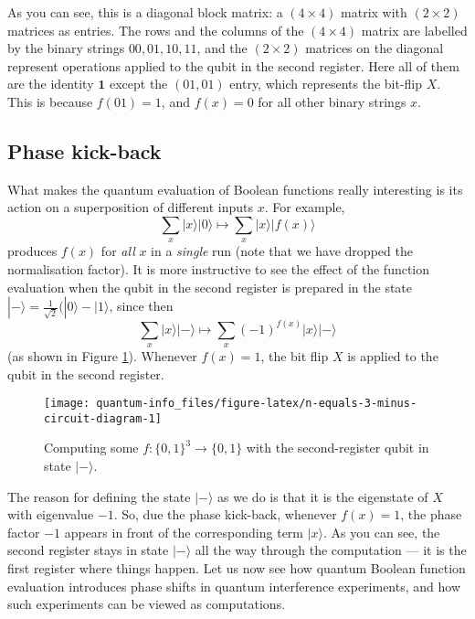 \documentclass[fleqn]{article}
\begin{document}
As you can see, this is a diagonal block matrix: a \((4\times 4)\) matrix with \((2\times 2)\) matrices as entries.
The rows and the columns of the \((4\times 4)\) matrix are labelled by the binary strings \(00, 01, 10, 11\), and the \((2\times 2)\) matrices on the diagonal represent operations applied to the qubit in the second register.
Here all of them are the identity \(\mathbf{1}\) except the \((01, 01)\) entry, which represents the bit-flip \(X\).
This is because \(f(01)=1\), and \(f(x)=0\) for all other binary strings \(x\).

\hypertarget{phase-kick-back}{%
\subsection{Phase kick-back}\label{phase-kick-back}}

What makes the quantum evaluation of Boolean functions really interesting is its action on a superposition of different inputs \(x\).
For example,
\[
  \sum_{x}|x\rangle|0\rangle
  \longmapsto
  \sum_{x}|x\rangle|f(x)\rangle
\]
produces \(f(x)\) for \emph{all} \(x\) in a \emph{single} run (note that we have dropped the normalisation factor).
It is more instructive to see the effect of the function evaluation when the qubit in the second register is prepared in the state \(|-\rangle = \frac{1}{\sqrt 2}(|0\rangle - |1\rangle\), since then
\[
  \sum_x|x\rangle|-\rangle
  \longmapsto
  \sum_x (-1)^{f(x)}|x\rangle|-\rangle
\]
(as shown in Figure \ref{fig:n-equals-3-minus-circuit-diagram}).
Whenever \(f(x)=1\), the bit flip \(X\) is applied to the qubit in the second register.



\begin{figure}[H]

{\centering \texttt{[image: quantum-info\_files/figure-latex/n-equals-3-minus-circuit-diagram-1]} 

}

\caption{Computing some \(f\colon\{0,1\}^3\to\{0,1\}\) with the second-register qubit in state \(|-\rangle\).}\label{fig:n-equals-3-minus-circuit-diagram}
\end{figure}

The reason for defining the state \(|-\rangle\) as we do is that it is the eigenstate of \(X\) with eigenvalue \(-1\).
So, due the phase kick-back, whenever \(f(x)=1\), the phase factor \(-1\) appears in front of the corresponding term \(|x\rangle\).
As you can see, the second register stays in state \(|-\rangle\) all the way through the computation --- it is the first register where things happen.
Let us now see how quantum Boolean function evaluation introduces phase shifts in quantum interference experiments, and how such experiments can be viewed as computations.
\end{document}
